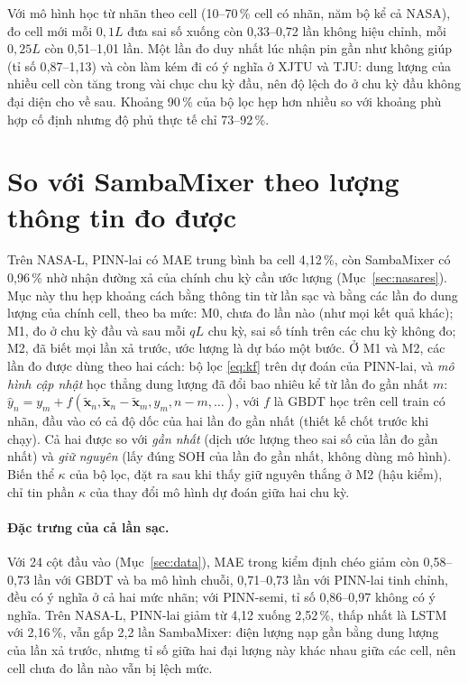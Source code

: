 \documentclass[12pt,a4paper,oneside]{report}
\theoremstyle{plain}
\theoremstyle{definition}
\begin{document}
Với mô hình học từ nhãn theo cell (10--70\,\% cell có nhãn, năm bộ kể cả NASA), đo cell mới mỗi $0{,}1L$ đưa sai số
xuống còn 0{,}33--0{,}72 lần không hiệu chỉnh, mỗi $0{,}25L$ còn 0{,}51--1{,}01 lần. Một lần đo duy nhất lúc nhận pin gần như không giúp (tỉ số
0{,}87--1{,}13) và còn làm kém đi có ý nghĩa ở XJTU và TJU: dung lượng của nhiều cell còn tăng trong vài chục chu kỳ đầu, nên độ lệch
đo ở chu kỳ đầu không đại diện cho về sau. Khoảng 90\,\% của bộ lọc hẹp hơn nhiều so với khoảng phù hợp cố định nhưng
độ phủ thực tế chỉ 73--92\,\%.

\section{So với SambaMixer theo lượng thông tin đo được}\label{sec:e31res}

Trên NASA-L, PINN-lai có MAE trung bình ba cell 4{,}12\,\%, còn SambaMixer có 0{,}96\,\% nhờ nhận đường xả của chính
chu kỳ cần ước lượng (Mục~\ref{sec:nasares}). Mục này thu hẹp khoảng cách bằng thông tin từ lần sạc và bằng các lần đo
dung lượng của chính cell, theo ba mức: M0, chưa đo lần nào (như mọi kết quả khác); M1, đo ở chu kỳ đầu và sau mỗi $qL$
chu kỳ, sai số tính trên các chu kỳ không đo; M2, đã biết mọi lần xả trước, ước lượng là dự báo một bước. Ở M1 và M2,
các lần đo được dùng theo hai cách: bộ lọc \eqref{eq:kf} trên dự đoán của PINN-lai, và \emph{mô hình cập nhật} học thẳng
dung lượng đã đổi bao nhiêu kể từ lần đo gần nhất $m$: $\hat y_n = y_m + f(\tilde{\mathbf{x}}_n, \tilde{\mathbf{x}}_n -
\tilde{\mathbf{x}}_m, y_m, n - m, \dots)$, với $f$ là GBDT học trên cell train có nhãn, đầu vào có cả độ dốc của hai lần đo
gần nhất (thiết kế chốt trước khi chạy). Cả hai được so với \emph{gần nhất} (dịch ước lượng theo sai số của lần đo gần
nhất) và \emph{giữ nguyên} (lấy đúng SOH của lần đo gần nhất, không dùng mô hình). Biến thể $\kappa$ của bộ lọc, đặt ra
sau khi thấy giữ nguyên thắng ở M2 (hậu kiểm), chỉ tin phần $\kappa$ của thay đổi mô hình dự đoán giữa hai chu kỳ.

\paragraph{Đặc trưng của cả lần sạc.} Với 24 cột đầu vào (Mục~\ref{sec:data}), MAE trong kiểm định chéo giảm còn
0{,}58--0{,}73 lần với GBDT và ba mô hình chuỗi, 0{,}71--0{,}73 lần với PINN-lai tinh chỉnh, đều có ý nghĩa ở cả hai mức nhãn; với
PINN-semi, tỉ số 0{,}86--0{,}97 không có ý nghĩa. Trên NASA-L, PINN-lai giảm từ 4{,}12 xuống 2{,}52\,\%, thấp nhất là LSTM
với 2{,}16\,\%, vẫn gấp 2{,}2 lần SambaMixer: điện lượng nạp gần bằng dung lượng của lần xả trước, nhưng tỉ số giữa hai
đại lượng này khác nhau giữa các cell, nên cell chưa đo lần nào vẫn bị lệch mức.
\end{document}
